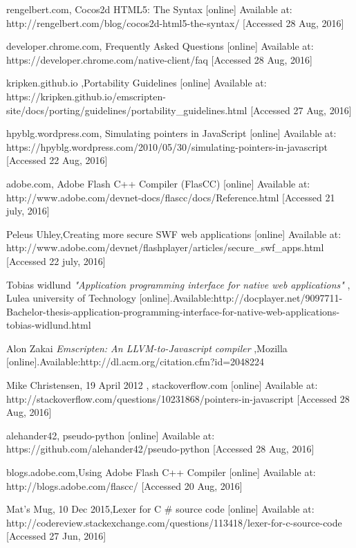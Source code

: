 \documentclass[23pt]{article}
\begin{document}
\begin{thebibliography}{9}
rengelbert.com, Cocos2d HTML5: The Syntax  [online] Available at:
{http://rengelbert.com/blog/cocos2d-html5-the-syntax/} [Accessed 28 Aug, 2016]

  developer.chrome.com, Frequently Asked Questions [online] Available at:
{https://developer.chrome.com/native-client/faq} [Accessed 28 Aug, 2016]

  kripken.github.io ,Portability Guidelines [online] Available at:
{https://kripken.github.io/emscripten-site/docs/porting/guidelines/portability\_guidelines.html} [Accessed 27 Aug, 2016]

hpyblg.wordpress.com, Simulating pointers in JavaScript [online] Available at:
{https://hpyblg.wordpress.com/2010/05/30/simulating-pointers-in-javascript} [Accessed 22 Aug, 2016]

adobe.com,  Adobe Flash C++ Compiler (FlasCC) [online] Available at:
{http://www.adobe.com/devnet-docs/flascc/docs/Reference.html} [Accessed 21 july, 2016]


 Peleus Uhley,Creating more secure SWF web applications  [online] Available at:
{http://www.adobe.com/devnet/flashplayer/articles/secure\_swf\_apps.html} [Accessed 22 july, 2016]

Tobias widlund
\textit{"Application programming interface for native web applications" }
, Lulea university of Technology
{[online].Available:http://docplayer.net/9097711-Bachelor-thesis-application-programming-interface-for-native-web-applications-tobias-widlund.html}
 
Alon Zakai 
\textit{Emscripten: An LLVM-to-Javascript compiler} 
 ,Mozilla
{[online].Available:http://dl.acm.org/citation.cfm?id=2048224}

Mike Christensen, 19 April 2012 , stackoverflow.com  [online] Available at:
{ http://stackoverflow.com/questions/10231868/pointers-in-javascript} [Accessed 28 Aug, 2016]

alehander42, pseudo-python  [online] Available at:
{https://github.com/alehander42/pseudo-python} [Accessed 28 Aug, 2016]

blogs.adobe.com,Using Adobe Flash C++ Compiler  [online] Available at:
{http://blogs.adobe.com/flascc/ } [Accessed 20 Aug, 2016]

Mat's Mug, 10 Dec 2015,Lexer for C \# source code  [online] Available at:
{http://codereview.stackexchange.com/questions/113418/lexer-for-c-source-code} [Accessed 27 Jun, 2016]


\end{thebibliography}
\end{document}
